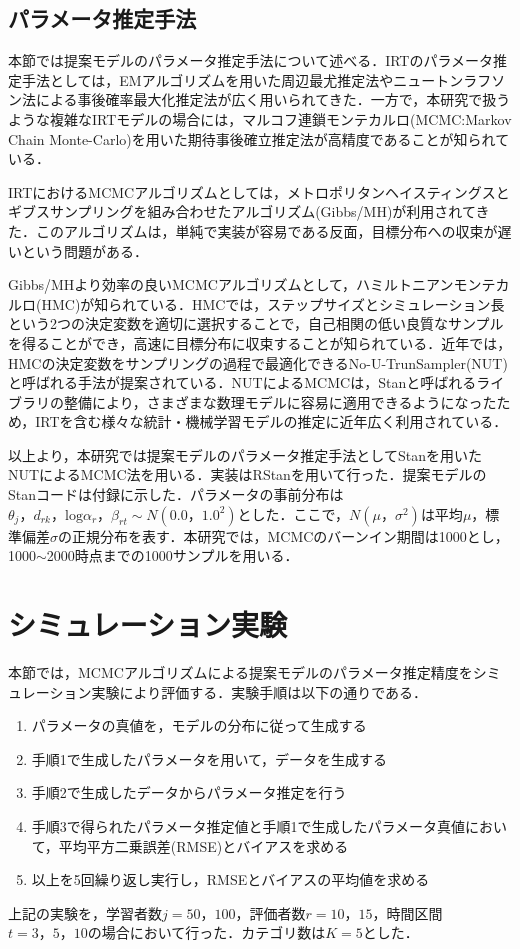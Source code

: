 \documentclass[a4paper,11pt,oneside,openany]{jsbook}
\begin{document}
\section{パラメータ推定手法}
本節では提案モデルのパラメータ推定手法について述べる．IRTのパラメータ推定手法としては，EMアルゴリズムを用いた周辺最尤推定法やニュートンラフソン法による事後確率最大化推定法が広く用いられてきた．一方で，本研究で扱うような複雑なIRTモデルの場合には，マルコフ連鎖モンテカルロ(MCMC:Markov Chain Monte-Carlo)を用いた期待事後確立推定法が高精度であることが知られている\cite{IRTUtoUeno,norm}．

IRTにおけるMCMCアルゴリズムとしては，メトロポリタンヘイスティングスとギブスサンプリングを組み合わせたアルゴリズム(Gibbs/MH)\cite{IRTUtoUeno,Patz,BiasUsami}が利用されてきた．このアルゴリズムは，単純で実装が容易である反面，目標分布への収束が遅いという問題がある\cite{Hoffman,Giroami}．

Gibbs/MHより効率の良いMCMCアルゴリズムとして，ハミルトニアンモンテカルロ(HMC)が知られている\cite{Rosenthal}．HMCでは，ステップサイズとシミュレーション長という2つの決定変数を適切に選択することで，自己相関の低い良質なサンプルを得ることができ，高速に目標分布に収束することが知られている\cite{Hoffman,Neal}．近年では，HMCの決定変数をサンプリングの過程で最適化できるNo-U-TrunSampler(NUT)\cite{Hoffman}と呼ばれる手法が提案されている．NUTによるMCMCは，Stan\cite{stan}と呼ばれるライブラリの整備により，さまざまな数理モデルに容易に適用できるようになったため，IRTを含む様々な統計・機械学習モデルの推定に近年広く利用されている\cite{Luo,Jiang,Matsura}．

以上より，本研究では提案モデルのパラメータ推定手法としてStanを用いたNUTによるMCMC法を用いる．実装はRStan\cite{rstan}を用いて行った．提案モデルのStanコードは付録に示した．パラメータの事前分布は$\theta_{j}，d_{rk}，\mathrm{log}\alpha_{r}，\beta_{rt}\sim N(0.0，1.0^{2})$とした．ここで，$N(\mu，\sigma^2)$は平均$\mu$，標準偏差$\sigma$の正規分布を表す．本研究では，MCMCのバーンイン期間は1000とし，1000$\sim$2000時点までの1000サンプルを用いる．

\newpage
\chapter{シミュレーション実験}

本節では，MCMCアルゴリズムによる提案モデルのパラメータ推定精度をシミュレーション実験により評価する．実験手順は以下の通りである．
\begin{enumerate}
\item パラメータの真値を，モデルの分布に従って生成する
\item 手順1で生成したパラメータを用いて，データを生成する
\item 手順2で生成したデータからパラメータ推定を行う
\item 手順3で得られたパラメータ推定値と手順1で生成したパラメータ真値において，平均平方二乗誤差(RMSE)とバイアスを求める
\item 以上を5回繰り返し実行し，RMSEとバイアスの平均値を求める
\end{enumerate}
上記の実験を，学習者数$j=50，100$，評価者数$r=10，15$，時間区間$t=3，5，10$の場合において行った．カテゴリ数は$K=5$とした．
\end{document}
